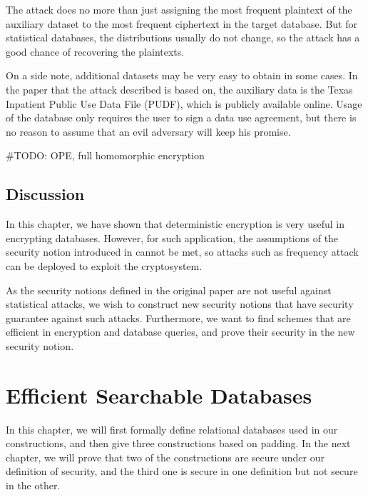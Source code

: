 \documentclass[10pt]{book}
\begin{document}
\begin{center}
\end{center}

The attack does no more than just assigning the most frequent plaintext of the auxiliary dataset to the most frequent ciphertext in the target database. But for statistical databases, the distributions usually do not change, so the attack has a good chance of recovering the plaintexts.

On a side note, additional datasets may be very easy to obtain in some cases. In the paper that the attack described is based on, the auxiliary data is the Texas Inpatient Public Use Data File (PUDF), which is publicly available online. Usage of the database only requires the user to sign a data use agreement, but there is no reason to assume that an evil adversary will keep his promise.


\#TODO: OPE, full homomorphic encryption

\section{Discussion}
In this chapter, we have shown that deterministic encryption is very useful in encrypting databases. However, for such application, the assumptions of the security notion introduced in \cite{Bellare2007, Boldyreva2008, Bellare2008} cannot be met, so attacks such as frequency attack \cite{Naveed:2015:IAP:2810103.2813651} can be deployed to exploit the cryptosystem.

As the security notions defined in the original paper are not useful against statistical attacks, we wish to construct new security notions that have security guarantee against such attacks. Furthermore, we want to find schemes that are efficient in encryption and database queries, and prove their security in the new security notion. 




\chapter{Efficient Searchable Databases}
In this chapter, we will first formally define relational databases used in our constructions, and then give three constructions based on padding. In the next chapter, we will prove that two of the constructions are secure under our definition of security, and the third one is secure in one definition but not secure in the other.
\end{document}
